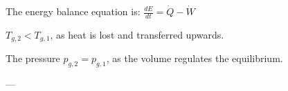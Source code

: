 The energy balance equation is:  
\( \frac{dE}{dt} = \dot{Q} - \dot{W} \)  

\( T_{g,2} < T_{g,1} \), as heat is lost and transferred upwards.  

The pressure \( p_{g,2} = p_{g,1} \), as the volume regulates the equilibrium.  

---